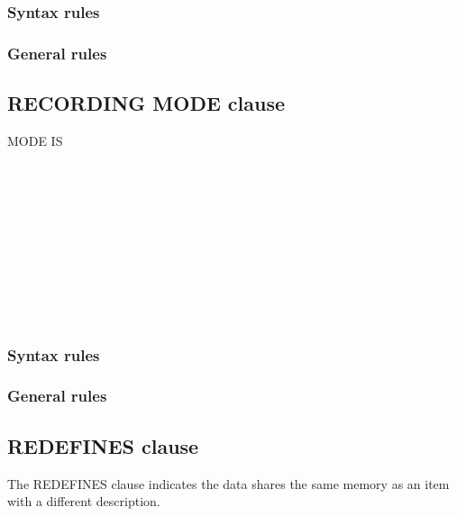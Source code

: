 \subsubsection{Syntax rules}

\subsubsection{General rules}

\subsection{RECORDING MODE clause}

\begin{syntax}[\deletedcolour]
   MODE IS
  \begin{1=}
    \begin{1=}
       \\
       \\
    \end{1=} \\

    \begin{1=}
       \\
       \\
    \end{1=} \\

     \\
  \end{1=}
\end{syntax}

\subsubsection{Syntax rules}

\subsubsection{General rules}

\subsection{REDEFINES clause}

The REDEFINES clause indicates the data shares the same memory as an item with a different description.

\begin{syntax}
   \identifier
\end{syntax}

